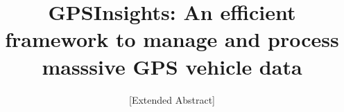 \documentclass{acm_proc_article-sp}
\begin{document}
\title{GPSInsights: An efficient framework to manage and process masssive GPS vehicle data}

\subtitle{[Extended Abstract]
}
%
%
%
%
%
\end{document}
